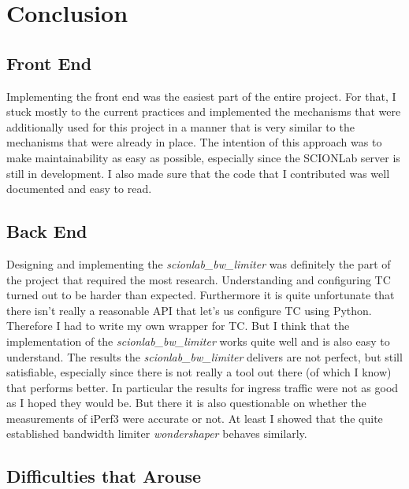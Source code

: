 \chapter{Conclusion}
\section{Front End}

Implementing the front end was the easiest part of the entire project. For that, I stuck mostly to the current practices and implemented the mechanisms that were additionally used for this project in a manner that is very similar to the mechanisms that were already in place. The intention of this approach was to make maintainability as easy as possible, especially since the \acs{SCIONLab} server is still in development. I also made sure that the code that I contributed was well documented and easy to read.

\section{Back End}

Designing and implementing the \textit{scionlab\_bw\_limiter} was definitely the part of the project that required the most research. Understanding and configuring \acs{TC} turned out to be harder than expected. Furthermore it is quite unfortunate that there isn't really a reasonable \acs{API} that let's us configure \acs{TC} using Python. Therefore I had to write my own wrapper for \acs{TC}. But I think that the implementation of the \textit{scionlab\_bw\_limiter} works quite well and is also easy to understand. The results the \textit{scionlab\_bw\_limiter} delivers are not perfect, but still satisfiable, especially since there is not really a tool out there (of which I know) that performs better. In particular the results for ingress traffic were not as good as I hoped they would be. But there it is also questionable on whether the measurements of iPerf3 were accurate or not. At least I showed that the quite established bandwidth limiter \textit{wondershaper} behaves similarly.

\section{Difficulties that Arouse}

